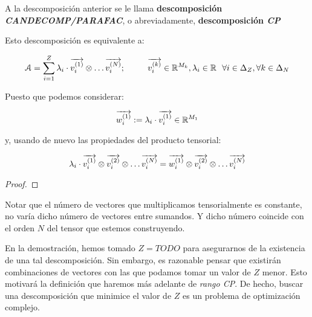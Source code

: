 A la descomposición anterior se le llama \textbf{descomposición \textit{CANDECOMP/PARAFAC}}, o abreviadamente, \textbf{descomposición \textit{CP}}

\begin{observacion}
    Esto descomposición es equivalente a:

    \begin{equation} \label{eq:cp_decomp}
        \mathcal{A} = \sum_{i = 1}^Z \lambda_i \cdot \overrightarrow{v_i^{(1)}} \otimes \ldots \overrightarrow{v_i^{(N)}}; \qquad
        \ \  \overrightarrow{v_i^{(k)}} \in \mathbb{R}^{M_k}, \lambda_i \in \mathbb{R} \ \  \forall i \in \Delta_{Z}, \forall k \in \Delta_{N}
    \end{equation}

    Puesto que podemos considerar:

    \begin{equation}
        \overrightarrow{w_i^{(1)}} := \lambda_i \cdot \overrightarrow{v_i^{(1)}} \in \mathbb{R}^{M_1}
    \end{equation}

    y, usando de nuevo las propiedades del producto tensorial:

    \begin{equation}
        \lambda_i \cdot \overrightarrow{v_i^{(1)}} \otimes \overrightarrow{v_i^{(2)}} \otimes \ldots \overrightarrow{v_i^{(N)}} = \overrightarrow{w_i^{(1)}} \otimes \overrightarrow{v_i^{(2)}} \otimes \ldots \overrightarrow{v_i^{(N)}}
    \end{equation}
\end{observacion}

\begin{proof}
\end{proof}

\begin{observacion}
    Notar que el número de vectores que multiplicamos tensorialmente es constante, no varía dicho número de vectores entre sumandos. Y dicho número coincide con el orden $N$ del tensor que estemos construyendo.
\end{observacion}

\begin{observacion}

En la demostración, hemos tomado $Z = TODO$ para asegurarnos de la existencia de una tal descomposición. Sin embargo, es razonable pensar que existirán combinaciones de vectores con las que podamos tomar un valor de $Z$ menor. Esto motivará la definición que haremos más adelante de \textit{rango CP}. De hecho, buscar una descomposición que minimice el valor de $Z$ es un problema de optimización complejo.

\end{observacion}

